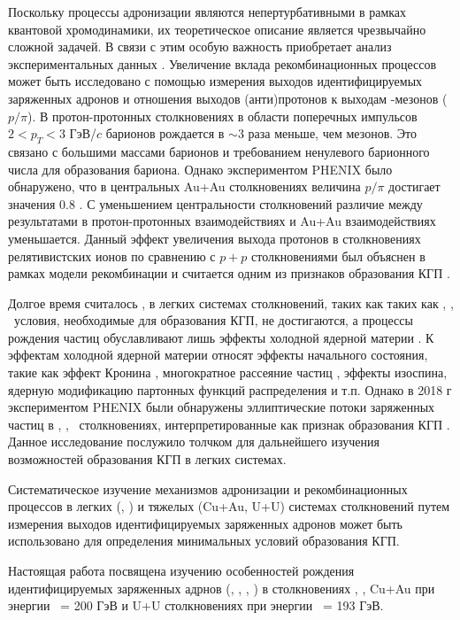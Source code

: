 Поскольку процессы адронизации являются непертурбативными в рамках квантовой хромодинамики, их теоретическое описание является чрезвычайно сложной задачей. В связи с этим особую важность приобретает анализ экспериментальных данных \autocite{nucleus2020}. Увеличение вклада рекомбинационных процессов может быть исследовано с помощью измерения выходов идентифицируемых заряженных адронов и отношения выходов (анти)протонов к выходам  \pipm-мезонов ($p/\pi$). 
В протон-протонных столкновениях в области поперечных импульсов $2<p_{T}<3$ ГэВ/$c$ барионов рождается в $\sim3$ раза меньше, чем мезонов. Это связано с большими массами барионов и требованием ненулевого барионного числа для образования бариона. Однако экспериментом PHENIX \cite{PHENIXoverview} было обнаружено, что в центральных Au+Au столкновениях величина $p/\pi$ достигает значения 0.8 \cite{p2piRatio_130GeV, p2piRatio_2003}. С уменьшением центральности столкновений различие между результатами в протон-протонных взаимодействиях и Au+Au взаимодействиях уменьшается.  
Данный эффект увеличения выхода протонов в столкновениях релятивистских ионов по сравнению с $p+p$ столкновениями был объяснен в рамках модели рекомбинации и считается одним из признаков образования КГП \cite{BaryonPuzzleHeavy, Recombination1, Recombination2}.

Долгое время считалось \cite{PHENIX_Nature,CNM}, в легких системах столкновений, таких как таких как \pal, \heau, \dau \ условия, необходимые для образования КГП, не достигаются, а процессы рождения частиц обуславливают лишь эффекты холодной ядерной материи \cite{CNM, phi_dAu, QGP_small_syst}. К эффектам холодной ядерной материи относят эффекты начального состояния, такие как эффект Кронина \cite{Cronin, Cronin_hadrons_pp_dAu_AuAu}, многократное рассеяние частиц \cite{MPI1, MPI2}, эффекты изоспина, ядерную модификацию партонных функций  распределения \cite{PDF1, PDF2} и т.п. Однако в 2018 г экспериментом PHENIX были обнаружены эллиптические потоки заряженных частиц в \pal, \heau, \dau \ столкновениях, интерпретированные как признак образования КГП \cite{PHENIX_Nature}. Данное исследование послужило толчком для дальнейшего изучения возможностей образования КГП в легких системах. 

Систематическое изучение механизмов адронизации и рекомбинационных процессов в легких (\pal, \heau) и тяжелых (Cu+Au, U+U) системах столкновений путем измерения выходов идентифицируемых заряженных адронов может быть использовано для определения минимальных условий образования КГП. 
 
Настоящая работа посвящена изучению особенностей рождения идентифицируемых заряженных адрнов (\pipm, \Kpm, \prot, \aprot) в столкновениях \pal, \heau, Cu+Au при энергии \sqsn \ = 200 ГэВ и U+U столкновениях при энергии \sqsn \ = 193 ГэВ.

